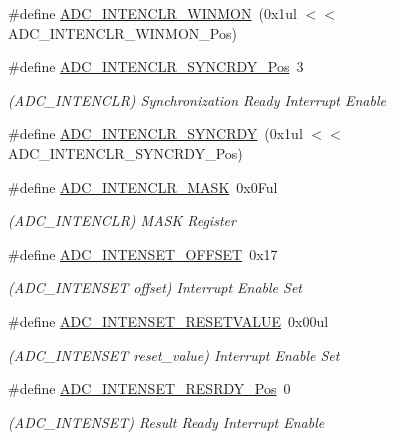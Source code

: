 \begin{DoxyCompactItemize}
\#define \mbox{\hyperlink{group___s_a_m_d21___a_d_c_gac4b4be4164b73463439cb18a227ac54c}{A\+D\+C\+\_\+\+I\+N\+T\+E\+N\+C\+L\+R\+\_\+\+W\+I\+N\+M\+ON}}~(0x1ul $<$$<$ A\+D\+C\+\_\+\+I\+N\+T\+E\+N\+C\+L\+R\+\_\+\+W\+I\+N\+M\+O\+N\+\_\+\+Pos)
\item 
\#define \mbox{\hyperlink{group___s_a_m_d21___a_d_c_ga5b3a6d2c71e27cf8812a53750da478c6}{A\+D\+C\+\_\+\+I\+N\+T\+E\+N\+C\+L\+R\+\_\+\+S\+Y\+N\+C\+R\+D\+Y\+\_\+\+Pos}}~3
\begin{DoxyCompactList}\small\item\em (A\+D\+C\+\_\+\+I\+N\+T\+E\+N\+C\+LR) Synchronization Ready Interrupt Enable \end{DoxyCompactList}\item 
\#define \mbox{\hyperlink{group___s_a_m_d21___a_d_c_ga8d420cb0a8cf85d9d1ef84a32bbc3447}{A\+D\+C\+\_\+\+I\+N\+T\+E\+N\+C\+L\+R\+\_\+\+S\+Y\+N\+C\+R\+DY}}~(0x1ul $<$$<$ A\+D\+C\+\_\+\+I\+N\+T\+E\+N\+C\+L\+R\+\_\+\+S\+Y\+N\+C\+R\+D\+Y\+\_\+\+Pos)
\item 
\#define \mbox{\hyperlink{group___s_a_m_d21___a_d_c_ga86fb35a78836c2ee97ccaa2801bcf8da}{A\+D\+C\+\_\+\+I\+N\+T\+E\+N\+C\+L\+R\+\_\+\+M\+A\+SK}}~0x0\+Ful
\begin{DoxyCompactList}\small\item\em (A\+D\+C\+\_\+\+I\+N\+T\+E\+N\+C\+LR) M\+A\+SK Register \end{DoxyCompactList}\item 
\#define \mbox{\hyperlink{group___s_a_m_d21___a_d_c_ga0b570aa514a0e36e01952c41e02df429}{A\+D\+C\+\_\+\+I\+N\+T\+E\+N\+S\+E\+T\+\_\+\+O\+F\+F\+S\+ET}}~0x17
\begin{DoxyCompactList}\small\item\em (A\+D\+C\+\_\+\+I\+N\+T\+E\+N\+S\+ET offset) Interrupt Enable Set \end{DoxyCompactList}\item 
\#define \mbox{\hyperlink{group___s_a_m_d21___a_d_c_ga26f1d6d4ed9e9e0440a649b4cc89e3bb}{A\+D\+C\+\_\+\+I\+N\+T\+E\+N\+S\+E\+T\+\_\+\+R\+E\+S\+E\+T\+V\+A\+L\+UE}}~0x00ul
\begin{DoxyCompactList}\small\item\em (A\+D\+C\+\_\+\+I\+N\+T\+E\+N\+S\+ET reset\+\_\+value) Interrupt Enable Set \end{DoxyCompactList}\item 
\#define \mbox{\hyperlink{group___s_a_m_d21___a_d_c_ga264acd7684104056b02d545b737b9b6c}{A\+D\+C\+\_\+\+I\+N\+T\+E\+N\+S\+E\+T\+\_\+\+R\+E\+S\+R\+D\+Y\+\_\+\+Pos}}~0
\begin{DoxyCompactList}\small\item\em (A\+D\+C\+\_\+\+I\+N\+T\+E\+N\+S\+ET) Result Ready Interrupt Enable \end{DoxyCompactList}\item 

\end{DoxyCompactItemize}
